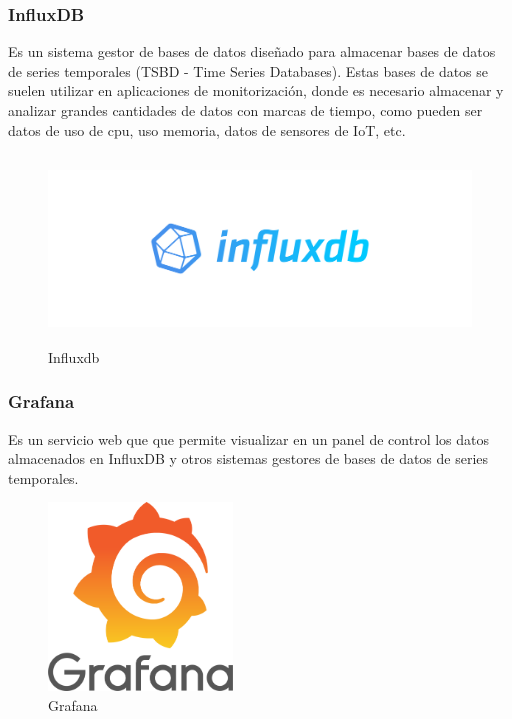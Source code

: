\subsubsection{InfluxDB}
Es un sistema gestor de bases de datos diseñado para almacenar bases
de datos de series temporales (TSBD - Time Series Databases). Estas bases de
datos se suelen utilizar en aplicaciones de monitorización, donde es necesario
almacenar y analizar grandes cantidades de datos con marcas de tiempo, como
pueden ser datos de uso de cpu, uso memoria, datos de sensores de IoT, etc.

\begin{figure}[H]
    \centering
    \includegraphics[width=\textwidth, keepaspectratio,
    height=5cm]{images/Influxdb_logo.svg_.png}
    \caption{Influxdb}
    \label{fig:logo_influx}
\end{figure}
\subsubsection{Grafana}
Es un servicio web que que permite visualizar en un panel de control
los datos almacenados en InfluxDB y otros sistemas gestores de bases de datos
de series temporales.
\begin{figure}[H]
    \centering
    \includegraphics[width=\textwidth, keepaspectratio,
    height=5cm]{images/1200px-Grafana_logo.svg.png}
    \caption{Grafana}
    \label{fig:grafana}
\end{figure}




